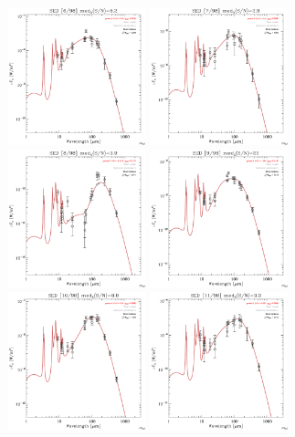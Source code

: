 \documentclass[preprint2,longabstract]{aastex}
\begin{document}
\begin{figure}
	\includegraphics[trim=0 2mm 0 0, clip, width=40mm]{SEDs/sed_06.pdf}
    \includegraphics[trim=0 2mm 0 0, clip, width=40mm]{SEDs/sed_07.pdf}
	\includegraphics[trim=0 2mm 0 0, clip, width=40mm]{SEDs/sed_08.pdf}
	\includegraphics[trim=0 2mm 0 0, clip, width=40mm]{SEDs/sed_09.pdf}
	\includegraphics[trim=0 2mm 0 0, clip, width=40mm]{SEDs/sed_10.pdf}
	\includegraphics[trim=0 2mm 0 0, clip, width=40mm]{SEDs/sed_11.pdf}

\end{figure}
\end{document}
